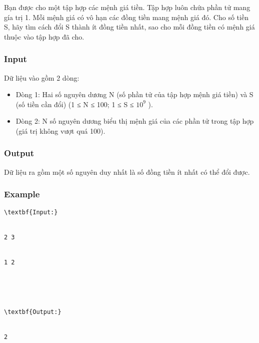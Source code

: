 



   Bạn được cho một tập hợp các mệnh giá tiền. Tập hợp luôn chứa phần tử mang gía trị 1. Mỗi mệnh giá có vô hạn các đồng tiền mang mệnh giá đó. Cho số tiền S, hãy tìm cách đổi S thành ít đồng tiền nhất, sao cho mỗi đồng tiền có mệnh giá thuộc vào tập hợp đã cho.  

\subsubsection{   Input  }

   Dữ liệu vào gồm 2 dòng:  
\begin{itemize}
	\item     Dòng 1: Hai số nguyên dương N (số phần tử của tập hợp mệnh giá tiền) và S (số tiền cần đổi) (1 ≤ N ≤ 100; 1 ≤ S ≤ $10^{9}$    ).   
	\item     Dòng 2: N số nguyên dương biểu thị mệnh giá của các phần tử trong tập hợp (giá trị không vượt quá 100).   
\end{itemize}

\subsubsection{   Output  }

   Dữ liệu ra gồm một số nguyên duy nhất là số đồng tiền ít nhất có thể đổi được.  

\subsubsection{   Example  }
\begin{verbatim}
\textbf{Input:}


2 3


1 2





\textbf{Output:}


2


\end{verbatim}
